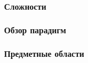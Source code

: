 \subsubsection{Сложности}





\subsubsection{Обзор парадигм}

\subsubsection{Предметные области}


\clearpage